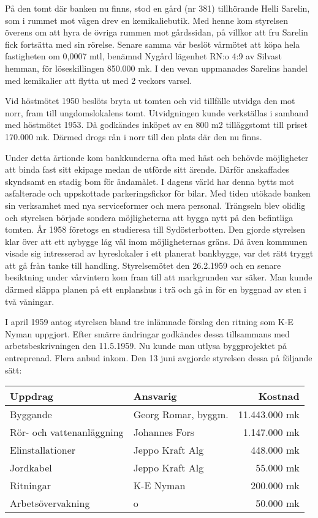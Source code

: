 På den tomt där banken nu finns, stod en gård (nr 381) tillhörande Helli Sarelin, som i rummet mot vägen drev en kemikaliebutik. Med henne kom styrelsen överens om att hyra de övriga rummen mot gårdssidan, på villkor att fru Sarelin fick fortsätta med sin rörelse. Senare samma vår beslöt vårmötet att köpa hela fastigheten om 0,0007 mtl, benämnd Nygård lägenhet RN:o 4:9 av Silvast hemman, för löseskillingen 850.000 mk. I den vevan uppmanades Sarelins handel med kemikalier att flytta ut med 2 veckors varsel.

Vid höstmötet 1950 beslöts bryta ut tomten och vid tillfälle utvidga den mot norr, fram till ungdomslokalens tomt. Utvidgningen kunde verkställas i samband med höstmötet 1953. Då godkändes inköpet av en 800 m2 tilläggstomt till priset 170.000 mk. Därmed drogs rån i norr till den plats där den nu finns.

Under detta årtionde kom bankkunderna ofta med häst och behövde möjligheter att binda fast sitt ekipage medan de utförde sitt ärende. Därför anskaffades skyndsamt en stadig bom för ändamålet. I dagens värld har denna bytts mot asfalterade och uppskottade parkeringsfickor för bilar.
Med tiden utökade banken sin verksamhet med nya serviceformer och mera personal. Trängseln blev olidlig och styrelsen började sondera möjligheterna att bygga nytt på den befintliga tomten. År 1958 företogs en studieresa till Sydösterbotten. Den gjorde styrelsen klar över att ett nybygge låg väl inom möjligheternas gräns. Då även kommunen visade sig intresserad av hyreslokaler i ett planerat bankbygge, var det rätt tryggt att gå från tanke till handling. Styrelsemötet den 26.2.1959 och en senare besiktning under vårvintern kom fram till att markgrunden var säker. Man kunde därmed släppa planen på ett enplanshus i trä och gå in för en byggnad av sten i två våningar.

I april 1959 antog styrelsen bland tre inlämnade förslag den ritning som K-E Nyman uppgjort. Efter smärre ändringar godkändes dessa tillsammans med arbetsbeskrivningen den 11.5.1959. Nu kunde man utlysa byggprojektet på entreprenad. Flera anbud inkom. Den 13 juni avgjorde styrelsen dessa på följande sätt:

\begin{center}
  \begin{tabular}{l l r}
    \hline
    Uppdrag & Ansvarig & Kostnad \\ \hline
    Byggande & Georg Romar, byggm. & 11.443.000 mk \\
    Rör- och vattenanläggning & Johannes Fors & 1.147.000 mk \\
    Elinstallationer & Jeppo Kraft Alg & 448.000 mk \\
    Jordkabel & Jeppo Kraft Alg & 55.000 mk \\
    Ritningar & K-E Nyman & 200.000 mk \\
    Arbetsövervakning & o & 50.000 mk \\
    \hline
  \end{tabular}
\end{center}

